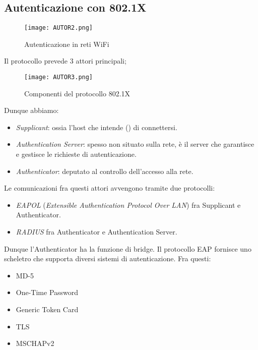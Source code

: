 \documentclass[14pt]{extreport}
\begin{document}
\subsection{Autenticazione con 802.1X}




\begin{figure}[H]
    \centering
    \texttt{[image: AUTOR2.png]}
    \caption{Autenticazione in reti WiFi}
    \label{AUTOR2}
\end{figure}

Il protocollo prevede 3 attori principali;


\begin{figure}[H]
    \centering
    \texttt{[image: AUTOR3.png]}
    \caption{Componenti del protocollo 802.1X}
    \label{AUTOR3}
\end{figure}

Dunque abbiamo:

\begin{itemize}
    \item \textit{Supplicant}: ossia l'host che intende () di connettersi.
    
    \item \textit{Authentication Server}: spesso non situato sulla rete, è il server che garantisce e gestisce le richieste di autenticazione.
    
    \item \textit{Authenticator}: deputato al controllo dell'accesso alla rete.
\end{itemize}



Le comunicazioni fra questi attori avvengono tramite due protocolli:

\begin{itemize}
    \item \textit{EAPOL} (\textit{Extensible Authentication Protocol Over LAN}) fra Supplicant e Authenticator.
    
    
    \item \textit{RADIUS} fra Authenticator e Authentication Server.
\end{itemize}


Dunque l'Authenticator ha la funzione di bridge.
Il protocollo EAP fornisce uno scheletro che supporta diversi sistemi di autenticazione. Fra questi:


\begin{itemize}
    \item MD-5
    \item One-Time Password
    \item Generic Token Card
    \item TLS
    \item MSCHAPv2
\end{itemize}
\end{document}
